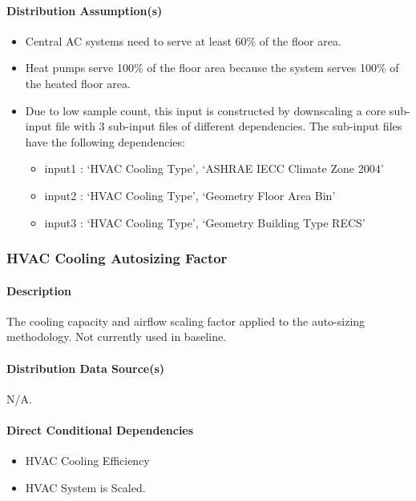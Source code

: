 \paragraph{Distribution Assumption(s)}
\begin{itemize}
    \item Central AC systems need to serve at least 60\% of the floor area.
    \item Heat pumps serve 100\% of the floor area because the system serves 100\% of the heated floor area.
    \item Due to low sample count, this input is constructed by downscaling a core sub-input file with 3 sub-input files of different dependencies. The sub-input files have the following dependencies: 
    \begin{itemize}
        \item input1 : ‘HVAC Cooling Type’, ‘ASHRAE IECC Climate Zone 2004’
        \item input2 : ‘HVAC Cooling Type’, ‘Geometry Floor Area Bin’
        \item input3 : ‘HVAC Cooling Type’, ‘Geometry Building Type RECS’
    \end{itemize}
\end{itemize}
 

\subsubsection{HVAC Cooling Autosizing Factor}
\paragraph{Description}
The cooling capacity and airflow scaling factor applied to the auto-sizing methodology. Not currently used in baseline. 

\paragraph{Distribution Data Source(s)}
N/A.

\paragraph{Direct Conditional Dependencies}
\begin{itemize}
    \item HVAC Cooling Efficiency
    \item HVAC System is Scaled.
\end{itemize}

